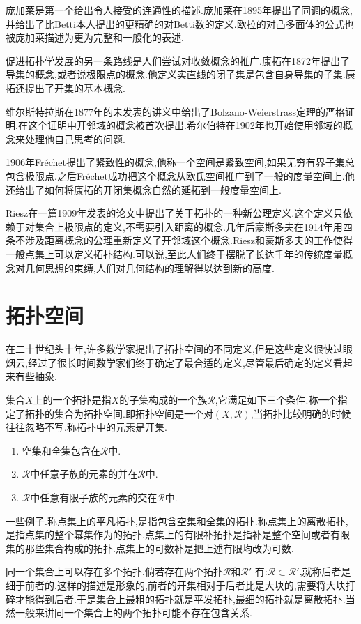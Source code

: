 庞加莱是第一个给出令人接受的连通性的描述.庞加莱在1895年提出了同调的概念,并给出了比Betti本人提出的更精确的对Betti数的定义.欧拉的对凸多面体的公式也被庞加莱描述为更为完整和一般化的表述.

促进拓扑学发展的另一条路线是人们尝试对收敛概念的推广.康拓在1872年提出了导集的概念,或者说极限点的概念.他定义实直线的闭子集是包含自身导集的子集.康拓还提出了开集的基本概念.

维尔斯特拉斯在1877年的未发表的讲义中给出了Bolzano-Weierstrass定理的严格证明.在这个证明中开邻域的概念被首次提出.希尔伯特在1902年也开始使用邻域的概念来处理他自己思考的问题.

1906年Fr\'echet提出了紧致性的概念,他称一个空间是紧致空间,如果无穷有界子集总包含极限点.之后Fr\'echet成功把这个概念从欧氏空间推广到了一般的度量空间上.他还给出了如何将康拓的开闭集概念自然的延拓到一般度量空间上.

Riesz在一篇1909年发表的论文中提出了关于拓扑的一种新公理定义.这个定义只依赖于对集合上极限点的定义,不需要引入距离的概念.几年后豪斯多夫在1914年用四条不涉及距离概念的公理重新定义了开邻域这个概念.Riesz和豪斯多夫的工作使得一般点集上可以定义拓扑结构.可以说,至此人们终于摆脱了长达千年的传统度量概念对几何思想的束缚,人们对几何结构的理解得以达到新的高度.
\section{拓扑空间}

在二十世纪头十年,许多数学家提出了拓扑空间的不同定义,但是这些定义很快过眼烟云,经过了很长时间数学家们终于确定了最合适的定义,尽管最后确定的定义看起来有些抽象.

集合$X$上的一个拓扑是指$X$的子集构成的一个族$\mathscr{R}$,它满足如下三个条件.称一个指定了拓扑的集合为拓扑空间.即拓扑空间是一个对$(X,\mathscr{R})$,当拓扑比较明确的时候往往忽略不写.称拓扑中的元素是开集.
\begin{enumerate}
	\item 空集和全集包含在$\mathscr{R}$中.
	\item $\mathscr{R}$中任意子族的元素的并在$\mathscr{R}$中.
	\item $\mathscr{R}$中任意有限子族的元素的交在$\mathscr{R}$中.
\end{enumerate}

一些例子.称点集上的平凡拓扑,是指包含空集和全集的拓扑.称点集上的离散拓扑,是指点集的整个幂集作为的拓扑.点集上的有限补拓扑是指补是整个空间或者有限集的那些集合构成的拓扑.点集上的可数补是把上述有限均改为可数.

同一个集合上可以存在多个拓扑,倘若存在两个拓扑$\mathscr{R}$和$\mathscr{R'}$ 有:$\mathscr{R}\subset\mathscr{R'}$,就称后者是细于前者的.这样的描述是形象的,前者的开集相对于后者比是大块的,需要将大块打碎才能得到后者.于是集合上最粗的拓扑就是平发拓扑,最细的拓扑就是离散拓扑.当然一般来讲同一个集合上的两个拓扑可能不存在包含关系.

